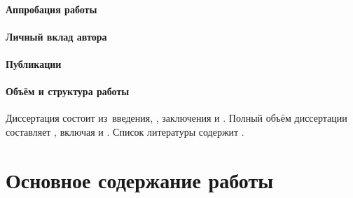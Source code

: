 \paragraph*{Аппробация работы}
\paragraph*{Личный вклад автора}
\paragraph*{Публикации}
\paragraph*{Объём и структура работы}
Диссертация состоит из~введения,
,
заключения и
.
%
Полный объём диссертации составляет
, включая
 и
.
Список литературы содержит
.


\newpage
\section*{Основное содержание работы}

%
\nocite{vakbib1}%
\nocite{vakbib2}%
%
\nocite{wosbib1}%
%
\nocite{scbib1}%
%
\nocite{patbib1}%
%
\nocite{progbib1}%
%
\nocite{confbib1}%
\nocite{confbib2}%
%
\nocite{bib1}%
\nocite{bib2}%

